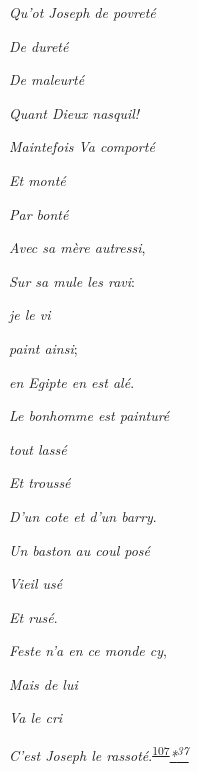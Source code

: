 \emph{Qu'ot Joseph de povreté}

\emph{De dureté}

\emph{De maleurté}

\emph{Quant Dieux nasquil!}

\emph{Maintefois Va comporté}

\emph{Et monté}

\emph{Par bonté}

\emph{\protect\hypertarget{13_Chapter_Six__THE_DEPICTION_OF_TH.xhtmlux5cux23page_195}{}{}Avec
sa mère autressi},

\emph{Sur sa mule les ravi}:

\emph{je le vi}

\emph{paint ainsi};

\emph{en Egipte en est alé}.

\emph{Le bonhomme est painturé}

\emph{tout lassé}

\emph{Et troussé}

\emph{D'un cote et d'un barry}.

\emph{Un baston au coul posé}

\emph{Vieil usé}

\emph{Et rusé}.

\emph{Feste n'a en ce monde cy},

\emph{Mais de lui}

\emph{Va le cri}

\emph{C'est Joseph le
rassoté}.\textsuperscript{\protect\hypertarget{13_Chapter_Six__THE_DEPICTION_OF_TH.xhtmlux5cux23id_1058}{\protect\hyperlink{23_NOTES.xhtmlux5cux23id_1059}{107}}}\emph{\protect\hypertarget{13_Chapter_Six__THE_DEPICTION_OF_TH.xhtmlux5cux23id_3061}{\protect\hyperlink{23_NOTES.xhtmlux5cux23id_3062}{*\textsuperscript{37}}}}

